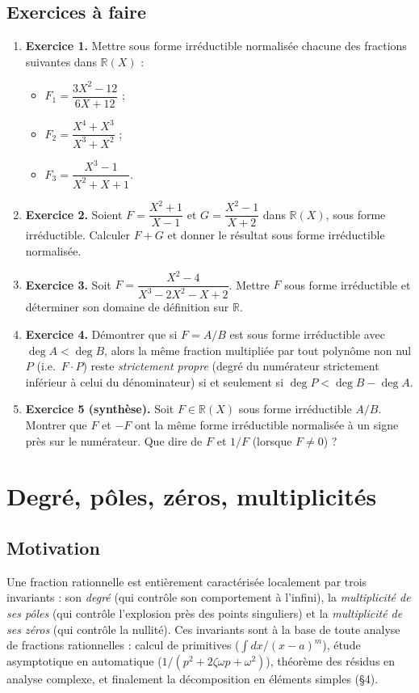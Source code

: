 \documentclass[12pt,a4paper]{report}
\theoremstyle{definition}
\theoremstyle{remark}
\begin{document}
\subsection{Exercices à faire}
\begin{enumerate}
    \item \textbf{Exercice 1.} Mettre sous forme irréductible normalisée chacune des fractions suivantes dans $\mathbb{R}(X)$ :
    \begin{itemize}
        \item $F_1 = \dfrac{3X^2 - 12}{6X + 12}$ ;
        \item $F_2 = \dfrac{X^4 + X^3}{X^3 + X^2}$ ;
        \item $F_3 = \dfrac{X^3 - 1}{X^2 + X + 1}$.
    \end{itemize}
    \item \textbf{Exercice 2.} Soient $F = \dfrac{X^2 + 1}{X - 1}$ et $G = \dfrac{X^2 - 1}{X + 2}$ dans $\mathbb{R}(X)$, sous forme irréductible. Calculer $F + G$ et donner le résultat sous forme irréductible normalisée.
    \item \textbf{Exercice 3.} Soit $F = \dfrac{X^2 - 4}{X^3 - 2X^2 - X + 2}$. Mettre $F$ sous forme irréductible et déterminer son domaine de définition sur $\mathbb{R}$.
    \item \textbf{Exercice 4.} Démontrer que si $F = A/B$ est sous forme irréductible avec $\deg A < \deg B$, alors la même fraction multipliée par tout polynôme non nul $P$ (i.e.\ $F \cdot P$) reste \emph{strictement propre} (degré du numérateur strictement inférieur à celui du dénominateur) si et seulement si $\deg P < \deg B - \deg A$.
    \item \textbf{Exercice 5 (synthèse).} Soit $F \in \mathbb{R}(X)$ sous forme irréductible $A/B$. Montrer que $F$ et $-F$ ont la même forme irréductible normalisée à un signe près sur le numérateur. Que dire de $F$ et $1/F$ (lorsque $F \neq 0$) ?
\end{enumerate}

\section{Degré, pôles, zéros, multiplicités}

\subsection{Motivation}
Une fraction rationnelle est entièrement caractérisée localement par trois invariants : son \emph{degré} (qui contrôle son comportement à l'infini), la \emph{multiplicité de ses pôles} (qui contrôle l'explosion près des points singuliers) et la \emph{multiplicité de ses zéros} (qui contrôle la nullité). Ces invariants sont à la base de toute analyse de fractions rationnelles : calcul de primitives ($\int dx/(x-a)^m$), étude asymptotique en automatique ($1/(p^2 + 2\zeta\omega p + \omega^2)$), théorème des résidus en analyse complexe, et finalement la décomposition en éléments simples (§4).
\end{document}
